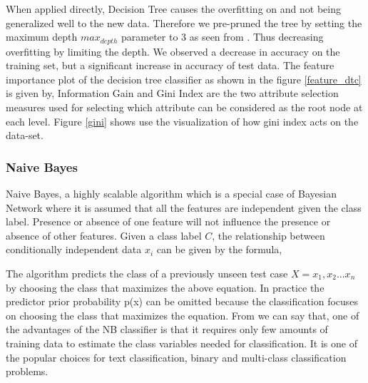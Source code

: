 \documentclass[conference]{IEEEtran}
\begin{document}
When applied directly, Decision Tree causes the overfitting on \cite{monoclonal1} and not being generalized well to the new data. Therefore we pre-pruned the tree by setting the maximum depth $max_{depth}$ parameter to 3 as seen from \cite{dt}. Thus decreasing overfitting by limiting the depth. We observed a decrease in accuracy on the training set, but a significant increase in accuracy of test data. The feature importance plot of the decision tree classifier as shown in the figure \ref{feature_dtc} is given by,
%
Information Gain and Gini Index are the two attribute selection measures used for selecting which attribute can be considered as the root node at each level. Figure \ref{gini} shows use the visualization of how gini index acts on the data-set.


\subsubsection*{Naive Bayes}
Naive Bayes, a highly scalable algorithm which is a special case of Bayesian Network where it is assumed that all the features are independent given the class label. Presence or absence of one feature will not influence the presence or absence of other features. Given a class label $C$, the relationship between conditionally independent data $x_i$ can be given by the formula,
\par
The algorithm predicts the class of a previously unseen test case $X={x_1, x_2... x_n}$ by choosing the class that maximizes the above equation. In practice the predictor prior probability p(x) can be omitted because the classification focuses on choosing the class that maximizes the equation. From \cite{nb} we can say that, one of the advantages of the NB classifier is that it requires only few amounts of training data to estimate the class variables needed for classification. It is one of the popular choices for text classification, binary and multi-class classification problems.
\end{document}
